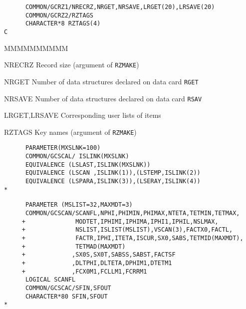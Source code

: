 \begin{verbatim}
      COMMON/GCRZ1/NRECRZ,NRGET,NRSAVE,LRGET(20),LRSAVE(20)
      COMMON/GCRZ2/RZTAGS
      CHARACTER*8 RZTAGS(4)
C
\end{verbatim}
\begin{DLtt}{MMMMMMMMMM}
\item[NRECRZ] Record size (argument of {\tt RZMAKE})
\item[NRGET]  Number of data structures declared on data card {\tt RGET}
\item[NRSAVE] Number of data structures declared on data card {\tt RSAV}
\item[LRGET,LRSAVE] Corresponding user lists of items
\item[RZTAGS]Key names (argument of {\tt RZMAKE})
\end{DLtt}
\begin{verbatim}
      PARAMETER(MXSLNK=100)
      COMMON/GCSCAL/ ISLINK(MXSLNK)
      EQUIVALENCE (LSLAST,ISLINK(MXSLNK))
      EQUIVALENCE (LSCAN ,ISLINK(1)),(LSTEMP,ISLINK(2))
      EQUIVALENCE (LSPARA,ISLINK(3)),(LSERAY,ISLINK(4))
*
\end{verbatim}
\begin{verbatim}
      PARAMETER (MSLIST=32,MAXMDT=3)
      COMMON/GCSCAN/SCANFL,NPHI,PHIMIN,PHIMAX,NTETA,TETMIN,TETMAX,
     +              MODTET,IPHIMI,IPHIMA,IPHI1,IPHIL,NSLMAX,
     +              NSLIST,ISLIST(MSLIST),VSCAN(3),FACTX0,FACTL,
     +              FACTR,IPHI,ITETA,ISCUR,SX0,SABS,TETMID(MAXMDT),
     +              TETMAD(MAXMDT)
     +             ,SX0S,SX0T,SABSS,SABST,FACTSF
     +             ,DLTPHI,DLTETA,DPHIM1,DTETM1
     +             ,FCX0M1,FCLLM1,FCRRM1
      LOGICAL SCANFL
      COMMON/GCSCAC/SFIN,SFOUT
      CHARACTER*80 SFIN,SFOUT
*
\end{verbatim}
